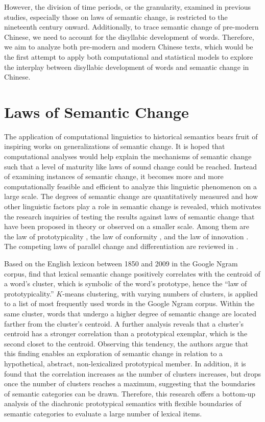 However, the division of time periods, or the granularity, examined in previous studies, especially those on laws of semantic change, is restricted to the nineteenth century onward. Additionally, to trace semantic change of pre-modern Chinese, we need to account for the disyllabic development of words. Therefore, we aim to analyze both pre-modern and modern Chinese texts, which would be the first attempt to apply both computational and statistical
models to explore the interplay between disyllabic development of words and semantic change in Chinese.

\section{Laws of Semantic Change}
The application of computational linguistics to historical semantics bears fruit of inspiring works on generalizations of semantic change. It is hoped that computational analyses would help explain the mechanisms of semantic change such that a level of maturity like laws of sound change could be reached. Instead of examining instances of semantic change, it becomes more and more computationally feasible and efficient to analyze this linguistic phenomenon on a large scale. The degrees of semantic change are quantitatively measured and how other linguistic factors play a role in semantic change is revealed, which motivates the research inquiries of testing the results against laws of semantic change that have been proposed in theory or observed on a smaller scale. Among them are the law of prototypicality \parencite{dubossarsky2015bottom}, the law of conformity \parencite{hamilton2016law}, and the law of innovation \parencite{hamilton2016law}. The competing laws of parallel change and differentiation are reviewed in \textcite{xu2015computational}.

Based on the English lexicon between 1850 and 2009 in the Google Ngram corpus, \textcite{dubossarsky2015bottom} find that lexical semantic change positively correlates with the centroid of a word's cluster, which is symbolic of the word's prototype, hence the ``law of prototypicality.'' $K$-means clustering, with varying numbers of clusters, is applied to a list of most frequently used words in the Google Ngram corpus. Within the same cluster, words that undergo a higher degree of semantic change are located farther from the cluster's centroid. A further analysis reveals that a cluster's centroid has a stronger correlation than a prototypical exemplar, which is the second closet to the centroid. Observing this tendency, the authors argue that this finding enables an exploration of semantic change in relation to a hypothetical, abstract, non-lexicalized prototypical member. In addition, it is found that the correlation increases as the number of clusters increases, but drops once the number of clusters reaches a maximum, suggesting that the boundaries of semantic categories can be drawn. Therefore, this research offers a bottom-up analysis of the diachronic prototypical semantics with flexible boundaries of semantic categories to evaluate a large number of lexical items.

